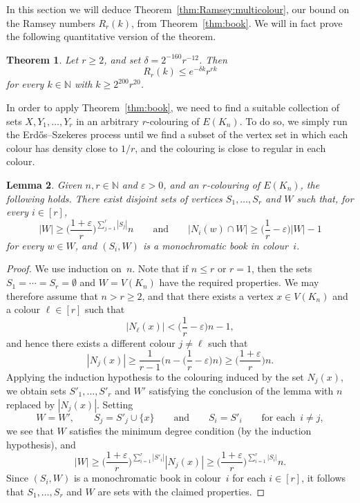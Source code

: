 \documentclass[12pt,reqno]{amsart}
\newtheorem{theorem}{Theorem}[section]
\newtheorem{lemma}[theorem]{Lemma}
\theoremstyle{definition}
\theoremstyle{remark}
\newcommand\N{\mathbb{N}}
\newcommand\eps{\varepsilon}
\renewcommand{\le}{\leqslant}
\renewcommand{\ge}{\geqslant}
\def\eps{\varepsilon}
\def\N{\mathbb{N}}
\begin{document}
In this section we will deduce Theorem~\ref{thm:Ramsey:multicolour}, our bound on the Ramsey numbers $R_r(k)$, from Theorem~\ref{thm:book}. We will in fact prove the following quantitative version of the theorem.

\begin{theorem}\label{thm:Ramsey:multicolour:quant}
Let $r \ge 2$, and set $\delta = 2^{-160} r^{-12}$. Then
$$R_r(k) \le e^{-\delta k} r^{rk}$$ 
for every $k \in \N$ with $k \ge 2^{200} r^{20}$. 
\end{theorem}

In order to apply Theorem~\ref{thm:book}, we need to find a suitable collection of sets $X,Y_1,\ldots,Y_r$ in an arbitrary $r$-colouring of $E(K_n)$. To do so, we simply run the Erd\H{o}s--Szekeres process until we find a subset of the vertex set in which each colour has density close to $1/r$, and the colouring is close to regular in each colour. %

\begin{lemma}\label{lem:ESz:steps}
Given\/ $n,r \in \N$ and\/ $\eps > 0$, and an $r$-colouring of $E(K_n)$, the following holds. There exist disjoint sets of vertices\/ $S_1,\dots,S_r$ and\/ $W$ such that, for every $i \in [r]$, 
$$|W| \ge \bigg( \frac{1+\eps}{r} \bigg)^{\sum_{j = 1}^r |S_j|} n \qquad \text{and} \qquad |N_i(w) \cap W| \ge \bigg( \frac{1}{r} - \eps \bigg) |W| - 1$$ 
for every $w \in W$, and $(S_i,W)$ is a monochromatic book in colour~$i$.
\end{lemma}

\begin{proof}
We use induction on~$n$. Note that if $n \le r$ or $r = 1$, then the sets $S_1 = \cdots = S_r = \emptyset$ and $W = V(K_n)$ have the required properties. We may therefore assume that $n > r \ge 2$, and that there exists a vertex $x \in V(K_n)$ and a colour $\ell \in [r]$ such that
$$|N_\ell(x)| < \bigg( \frac{1}{r} - \eps \bigg) n - 1,$$
and hence there exists a different colour $j \ne \ell$ such that 
$$|N_j(x)| \ge \frac{1}{r-1} \bigg( n - \bigg( \frac{1}{r} - \eps \bigg) n \bigg) \ge \bigg( \frac{1 + \eps}{r} \bigg) n.$$
Applying the induction hypothesis to the colouring induced by the set $N_j(x)$, we obtain sets $S'_1,\ldots,S'_r$ and $W'$ satisfying the conclusion of the lemma with $n$ replaced by $|N_j(x)|$. Setting 
$$W = W', \qquad S_j = S'_j \cup \{x\} \qquad \text{and} \qquad S_i = S'_i \qquad \text{for each } \, i \ne j,$$ 
we see that $W$ satisfies the minimum degree condition (by the induction hypothesis), and
$$|W| \ge \bigg( \frac{1+\eps}{r} \bigg)^{\sum_{i = 1}^r |S'_i|}|N_j(x)| \ge \bigg( \frac{1+\eps}{r} \bigg)^{\sum_{i=1}^r |S_i|}n.$$
Since $(S_i,W)$ is a monochromatic book in colour~$i$ for each $i \in [r]$, it follows that $S_1,\dots,S_r$ and $W$ are sets with the claimed properties.
\end{proof}
\end{document}

